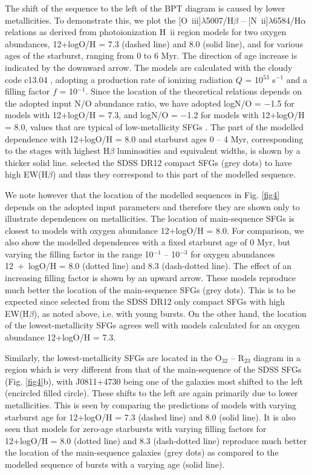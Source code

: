 \documentclass[useAMS,usenatbib]{mn2e}
\begin{document}
The shift of the sequence  
to the left of the BPT diagram is caused by lower metallicities.
To demonstrate this, we plot the [O~{\sc iii}]$\lambda$5007/H$\beta$ -- 
[N~{\sc ii}]$\lambda$6584/H$\alpha$ relations as derived from photoionization
H~{\sc ii} region models for two oxygen abundances, 12+logO/H = 7.3 (dashed 
line) and 8.0 (solid line), and for various ages of the 
starburst, ranging from 0 to 6 Myr. The direction of age increase is
indicated by the downward arrow. The models are calculated with the 
{\sc cloudy} code c13.04 \citep{F98,F13}, adopting a production rate
of ionizing radiation $Q$ = 10$^{53}$ s$^{-1}$ and a filling factor 
$f$ = 10$^{-1}$. Since the location of the theoretical relations depends on the
adopted input N/O abundance ratio, we have adopted logN/O = $-$1.5 for models 
with 12+logO/H = 7.3, and logN/O = $-$1.2 for models with 12+logO/H = 8.0, 
values that are typical of low-metallicity SFGs \citep[e.g. ][]{I06}. 
The part of the modelled dependence with 12+logO/H = 8.0 and starburst
ages 0 -- 4 Myr, corresponding to the stages with highest H$\beta$ luminosities
and equivalent widths, is shown by a thicker solid line. \citet{I16c} selected
the SDSS DR12 compact SFGs (grey dots) to have high EW(H$\beta$) and thus they 
correspond to this part of the modelled sequence.
 
We note however that the location of the modelled sequences in 
Fig. \ref{fig4} depends on the adopted input parameters and therefore they
are shown only to illustrate dependences on metallicities. The location of 
main-sequence SFGs is closest to models with oxygen abundance 
12+logO/H = 8.0. 
For comparison, we also show the modelled dependences with a fixed 
starburst age of 0 Myr, but varying the filling factor 
in the range 10$^{-1}$ -- 10$^{-3}$ for oxygen abundances 12~+~logO/H = 8.0 
(dotted line) and 8.3 (dash-dotted line). The effect of an increasing filling factor is shown by an upward arrow. These models reproduce much better
the location of the main-sequence SFGs (grey dots). This is to be expected 
since \citet{I16c}
selected from the SDSS DR12 only compact SFGs with high EW(H$\beta$), as noted
above, i.e. with young bursts.
On the other hand, the location of the lowest-metallicity 
SFGs agrees well with models calculated for an oxygen abundance 
12+logO/H = 7.3. 

Similarly, the lowest-metallicity SFGs are located in the O$_{32}$ -- R$_{23}$ 
diagram in a region which is very different from that of the main-sequence of 
the SDSS SFGs (Fig. \ref{fig4}b), with J0811$+$4730 being one of the 
galaxies  most shifted to the left (encircled filled circle). 
These shifts to the left are again primarily due to lower metallicities.
This is seen by comparing the 
predictions of models with varying starburst age for 
12+logO/H = 7.3 (dashed line) and
8.0 (solid line). It is also seen that models for zero-age starbursts 
with varying filling factors for 12+logO/H = 8.0 (dotted line) and
8.3 (dash-dotted line) reproduce much better the location of the main-sequence
galaxies (grey dots) as compared to the modelled sequence of bursts with a 
varying age (solid line).
\end{document}
